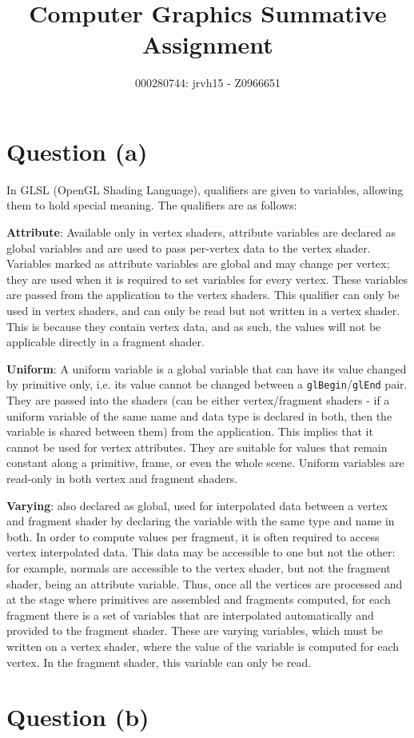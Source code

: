 \documentclass[11pt]{article}
\title{Computer Graphics Summative Assignment}
\author{000280744: jrvh15 - Z0966651}
\begin{document}
\maketitle

\section{Question (a)}
In GLSL (OpenGL Shading Language), qualifiers are given to variables, allowing 
them to hold special meaning. The qualifiers are as follows:
\enumerate
\item{\textbf{Attribute}: Available only in vertex shaders, attribute variables 
are declared as global variables and are used to pass per-vertex data to the 
vertex shader. Variables marked as attribute variables are global 
and may change per vertex; they are used when it is required to set variables 
for every vertex. These variables are passed from the application to the vertex 
shaders. This qualifier can only be used in vertex shaders, and can only be 
read but not written in a vertex shader. This is because they contain vertex 
data, and as such, the values will not be applicable directly in a fragment 
shader.}
\item{\textbf{Uniform}: A uniform variable is a global variable that can have 
its value changed by primitive only, i.e. its value cannot be changed between a 
\texttt{glBegin}/\texttt{glEnd} pair. They are passed into the shaders (can be 
either vertex/fragment shaders - if a uniform variable of the same name and 
data type is declared in both, then the variable is shared between them) from 
the application. This implies that it cannot be used for vertex attributes. They 
are suitable for values that remain constant along a primitive, frame, or even 
the whole scene. Uniform variables are read-only in both vertex and fragment 
shaders.}
\item{\textbf{Varying}: also declared as global, used for interpolated data 
between a vertex and fragment shader by declaring the variable with the same 
type and name in both. In order to compute values per fragment, it is often 
required to access vertex interpolated data. This data may be accessible 
to one but not the other: for example, normals are accessible to the vertex 
shader, but not the fragment shader, being an attribute variable. Thus, once all 
the vertices are processed and at the stage where primitives are assembled and 
fragments computed, for each fragment there is a set of variables that are 
interpolated automatically and provided to the fragment shader. These are 
varying variables, which must be written on a vertex shader, where the value of 
the variable is computed for each vertex. In the fragment shader, this variable 
can only be read.}
\section{Question (b)}
\end{document}
